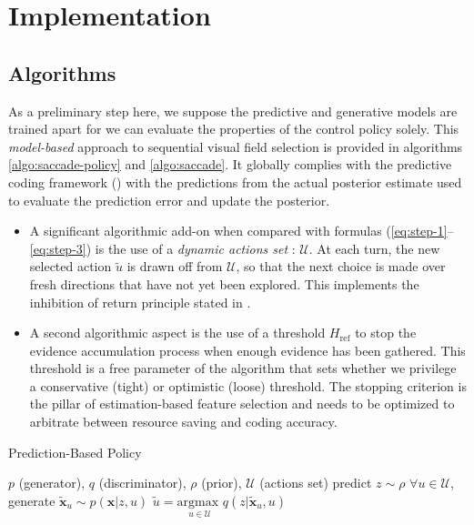 \documentclass{article} %
\begin{document}
\section{Implementation}

\subsection{Algorithms}
As a preliminary step here, we suppose the predictive and generative models are trained apart for we  
can evaluate the properties of the control policy solely.  This \emph{model-based} approach to sequential visual field selection is provided in algorithms \ref{algo:saccade-policy} and \ref{algo:saccade}. It globally complies with the predictive coding framework (\cite{rao1999predictive}) with the predictions from the actual posterior estimate used to evaluate the prediction error and update the posterior.

\begin{itemize}
	\item A significant algorithmic add-on when compared with formulas (\ref{eq:step-1}--\ref{eq:step-3}) is the use of a \emph{dynamic actions set} : $\mathcal{U}$. At each turn, the new selected action $\tilde{u}$ is drawn off from $\mathcal{U}$, so that the next choice is made over fresh directions that have not yet been explored. This implements the inhibition of return principle stated in \cite{itti2001computational}.
	\item A second algorithmic aspect is the use of a threshold $H_\text{ref}$ to stop the evidence accumulation process when enough evidence has been gathered. This threshold is a free parameter of the algorithm that sets whether we privilege a conservative (tight) or optimistic (loose) threshold. The stopping criterion is the pillar of estimation-based feature selection and needs to be optimized to arbitrate between resource saving and coding accuracy. 
\end{itemize}



\begin{algorithm}[t!]
	\caption{Prediction-Based Policy}\label{algo:saccade-policy}
	\begin{algorithmic}
		\REQUIRE  $p$ (generator), $q$ (discriminator), $\rho$ (prior), $\mathcal{U}$ (actions set)
		\STATE predict $z \sim \rho$
		\STATE $\forall u \in \mathcal{U}$, generate $\tilde{\boldsymbol{x}}_u \sim p(\boldsymbol{x}|z,u)$
		\RETURN $\tilde{u} = \underset{u \in \mathcal{U}}{\text{argmax }} q(z|\tilde{\boldsymbol{x}}_u,u)$
	\end{algorithmic}
\end{algorithm}
\end{document}
